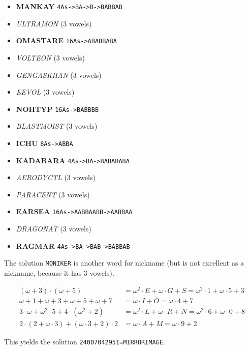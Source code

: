 \begin{multicols}{2}
  \begin{itemize}
    \item \textbf{MANKAY} \texttt{4As->BA->B->BABBAB}
    \item \textit{ULTRAMON} (3 vowels)
    \item \textbf{OMASTARE} \texttt{16As->ABABBABA}
    \item \textit{VOLTEON} (3 vowels)
    \item \textit{GENGASKHAN} (3 vowels)
    \item \textit{EEVOL} (3 vowels)
    \item \textbf{NOHTYP} \texttt{16As->BABBBB}
    \item \textit{BLASTMOIST} (3 vowels)
    \item \textbf{ICHU} \texttt{8As->ABBA}
    \item \textbf{KADABARA} \texttt{4As->BA->BABABABA}
    \item \textit{AERODYCTL} (3 vowels)
    \item \textit{PARACENT} (3 vowels)
    \item \textbf{EARSEA} \texttt{16As->AABBAABB->AABBAA}
    \item \textit{DRAGONAT} (3 vowels)
    \item \textbf{RAGMAR} \texttt{4As->BA->BAB->BABBAB}
  \end{itemize}
\end{multicols}

The solution \texttt{MONIKER} is another word for nickname
(but is not excellent as a nickname, because it has 3 vowels).


\begin{align*}
  (\omega+3)\cdot(\omega+5)&=\omega^2\cdot E+\omega\cdot G+S
                            =\omega^2\cdot 1+\omega\cdot 5+3 \\
  \omega+1+\omega+3+\omega+5+\omega+7&=\omega\cdot I+O
                                      =\omega\cdot 4+7 \\
  3\cdot\omega+\omega^2\cdot 5+4\cdot(\omega^2+2)&=
        \omega^2\cdot L+\omega\cdot R+N =
        \omega^2\cdot 6+\omega\cdot 0+8 \\
  2\cdot(2+\omega\cdot3)+(\omega\cdot3+2)\cdot2&=
        \omega\cdot A+M =
        \omega\cdot 9+2
\end{align*}

This yields the solution \texttt{24007042951=MIRRORIMAGE}.

